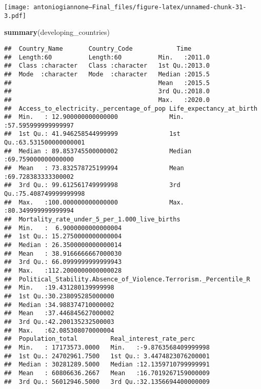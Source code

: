 \documentclass[
]{article}
\newenvironment{Shaded}{\begin{snugshade}}{\end{snugshade}}
\newcommand{\FunctionTok}[1]{\textcolor[rgb]{0.13,0.29,0.53}{\textbf{#1}}}
\newcommand{\NormalTok}[1]{#1}
\begin{document}
\texttt{[image: antoniogiannone---Final\_files/figure-latex/unnamed-chunk-31-3.pdf]}

\begin{Shaded}
\begin{Highlighting}[]
\FunctionTok{summary}\NormalTok{(developing\_countries)}
\end{Highlighting}
\end{Shaded}

\begin{verbatim}
##  Country_Name       Country_Code            Time       
##  Length:60          Length:60          Min.   :2011.0  
##  Class :character   Class :character   1st Qu.:2013.0  
##  Mode  :character   Mode  :character   Median :2015.5  
##                                        Mean   :2015.5  
##                                        3rd Qu.:2018.0  
##                                        Max.   :2020.0  
##  Access_to_electricity._percentage_of_pop Life_expectancy_at_birth    
##  Min.   : 12.900000000000000              Min.   :57.595999999999997  
##  1st Qu.: 41.946258544999999              1st Qu.:63.531500000000001  
##  Median : 89.853745500000002              Median :69.759000000000000  
##  Mean   : 73.832578725199994              Mean   :69.728383333300002  
##  3rd Qu.: 99.612561749999998              3rd Qu.:75.408749999999998  
##  Max.   :100.000000000000000              Max.   :80.349999999999994  
##  Mortality_rate_under_5_per_1.000_live_births
##  Min.   :  6.9000000000000004                
##  1st Qu.: 15.2750000000000004                
##  Median : 26.3500000000000014                
##  Mean   : 38.9166666667000030                
##  3rd Qu.: 66.0999999999999943                
##  Max.   :112.2000000000000028                
##  Political_Stability.Absence_of_Violence.Terrorism._Percentile_R
##  Min.   :19.431280139999998                                     
##  1st Qu.:30.238095285000000                                     
##  Median :34.988374710000002                                     
##  Mean   :37.446845627000002                                     
##  3rd Qu.:42.200135232500003                                     
##  Max.   :62.085308070000004                                     
##  Population_total         Real_interest_rate_perc      
##  Min.   : 17173573.0000   Min.   :-9.8763568409999998  
##  1st Qu.: 24702961.7500   1st Qu.: 3.4474823076200001  
##  Median : 30281289.5000   Median :12.1359710799999991  
##  Mean   : 60806636.2667   Mean   :16.7019267159000009  
##  3rd Qu.: 56012946.5000   3rd Qu.:32.1356694400000009  

\end{verbatim}
\end{document}
